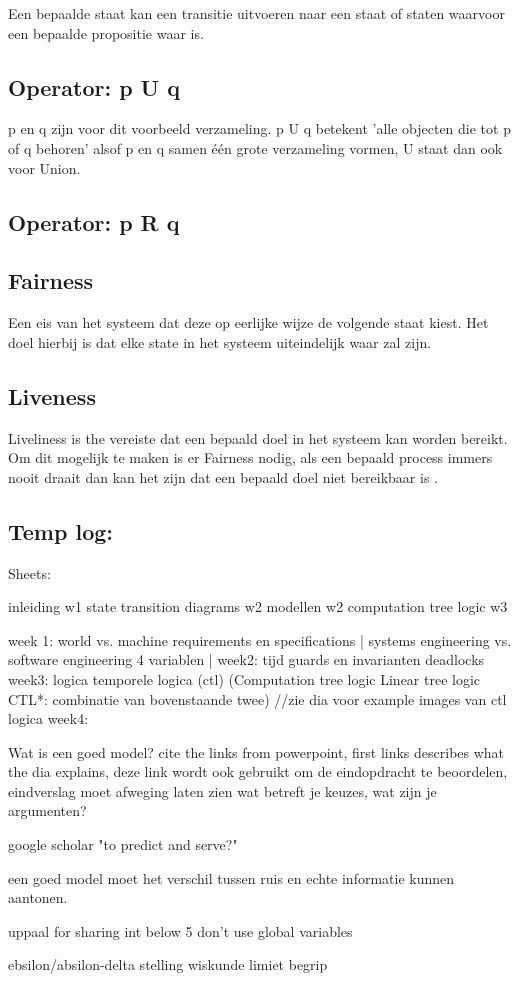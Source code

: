\documentclass{article}
\begin{document}
Een bepaalde staat kan een transitie uitvoeren naar een staat of staten waarvoor een bepaalde propositie waar is.

\subsection{Operator: p U q}

p en q zijn voor dit voorbeeld verzameling. p U q betekent 'alle objecten die tot p of q behoren' alsof p en q samen één grote verzameling vormen, U staat dan ook voor Union.

\subsection{Operator: p R q}

\subsection{Fairness}

Een eis van het systeem dat deze op eerlijke wijze de volgende staat kiest. Het doel hierbij is dat elke state in het systeem uiteindelijk waar zal zijn.

\subsection{Liveness}

Liveliness is the vereiste dat een bepaald doel in het systeem kan worden bereikt. Om dit mogelijk te maken is er Fairness nodig, als een bepaald process immers nooit draait dan kan het zijn dat een bepaald doel niet bereikbaar is \cite{fairnessandliveness}.

\newpage
\subsection{Temp log:}
Sheets:

inleiding w1
state transition diagrams w2
modellen w2
computation tree logic w3


week 1: 
world vs. machine
requirements en specifications |
systems engineering vs. software engineering
4 variablen |
week2:
tijd
guards en invarianten
deadlocks
week3:
logica
temporele logica (ctl)
(Computation tree logic
Linear tree logic
CTL*: combinatie van bovenstaande twee)
//zie dia voor example images van ctl logica
week4:




Wat is een goed model? cite the links from powerpoint, first links describes what the dia explains, deze link wordt ook gebruikt om de eindopdracht te beoordelen, eindverslag moet afweging laten zien wat betreft je keuzes, wat zijn je argumenten?

google scholar "to predict and serve?"

een goed model moet het verschil tussen ruis en echte informatie kunnen aantonen.

uppaal for sharing int below 5 don't use global variables

ebsilon/absilon-delta stelling wiskunde limiet begrip
\newpage


\end{document}
